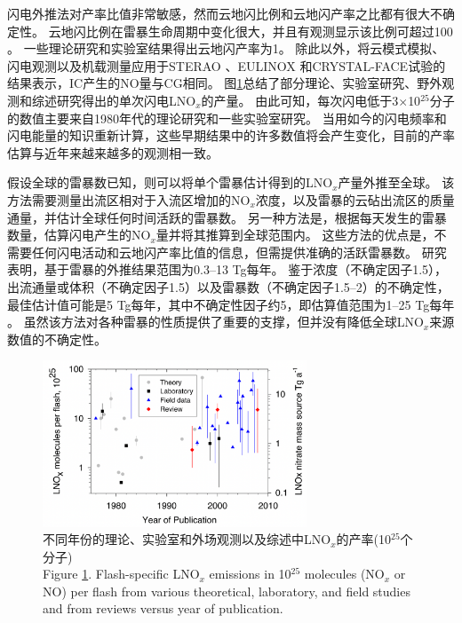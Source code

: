 

闪电外推法对产率比值非常敏感\citep{Bond.2002}，然而云地闪比例和云地闪产率之比都有很大不确定性。
云地闪比例在雷暴生命周期中变化很大，并且有观测显示该比例可超过100 \citep{Dye.2000,DeCaria.2005,Ott.2007}。
一些理论研究\citep{Cooray.1997}和实验室结果\citep{Cooray.2005}得出云地闪产率为1。
除此以外，将云模式模拟、闪电观测以及机载测量应用于STERAO \citep{DeCaria.2000}、EULINOX \citep{Fehr.2004}和CRYSTAL-FACE试验的结果表示，IC产生的NO量与CG相同。
图\ref{figure:lnox_production_Schumann}总结了部分理论、实验室研究、野外观测和综述研究得出的单次闪电LNO$_x$的产量。
由此可知，每次闪电低于3$\times$10$^{25}$分子的数值主要来自1980年代的理论研究和一些实验室研究。
当用如今的闪电频率和闪电能量的知识重新计算，这些早期结果中的许多数值将会产生变化，目前的产率估算与近年来越来越多的观测相一致。

假设全球的雷暴数已知，则可以将单个雷暴估计得到的LNO$_x$产量外推至全球\citep{Chameides.1987,Huntrieser.1998,Huntrieser.2002}。
该方法需要测量出流区相对于入流区增加的NO$_x$浓度，以及雷暴的云砧出流区的质量通量，并估计全球任何时间活跃的雷暴数。
另一种方法是，根据每天发生的雷暴数量，估算闪电产生的NO$_x$量并将其推算到全球范围内\citep{Ridley.2004}。 这些方法的优点是，不需要任何闪电活动和云地闪产率比值的信息，但需提供准确的活跃雷暴数。
研究表明，基于雷暴的外推结果范围为0.3--13 Tg每年。
鉴于浓度（不确定因子1.5），出流通量或体积（不确定因子1.5）以及雷暴数（不确定因子1.5--2）的不确定性，
最佳估计值可能是5 Tg每年，其中不确定性因子约5，即估算值范围为1--25 Tg每年 \citep{Chameides.1987}。
虽然该方法对各种雷暴的性质提供了重要的支撑，但并没有降低全球LNO$_x$来源数值的不确定性。

\begin{figure}[H]
\centering
\includegraphics[width=0.7\textwidth]{./figures/lnox_production_Schumann.png}
\caption{不同年份的理论、实验室和外场观测以及综述中LNO$_x$的产率(10$^{25}$个分子)\\
Figure \ref{figure:lnox_production_Schumann}.
Flash-specific LNO$_x$ emissions in 10$^{25}$ molecules (NO$_x$ or NO) per flash from various theoretical, laboratory, and field studies and from reviews versus year of publication.
}
\label{figure:lnox_production_Schumann}
\end{figure}


